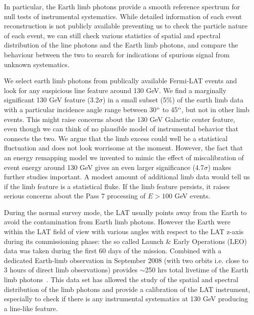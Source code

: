 \documentclass[aps,twocolumn,prd,superscriptaddress,showpacs,nofootinbib,fixfloat]{revtex4}
\newcommand{\degree}{^{\rm o}}
\begin{document}
In particular, the Earth limb photons provide a smooth
reference spectrum for null tests of instrumental
systematics. While detailed information of each event
reconstruction is not publicly available preventing us to
check the particle nature of each event, we can still check
various statistics of spatial and spectral distribution of
the line photons and the Earth limb photons, and compare the
behaviour between the two to search for indications of
spurious signal from unknown systematics. 

We select earth limb photons from publically available Fermi-LAT events and look for any suspicious line feature around 130 GeV.  We find a marginally significant 130 GeV feature (3.2$\sigma$) in a small
subset (5\%) of the earth limb data with a particular incidence angle range between 30$\degree$ to 45$\degree$, but not in other limb events.  This might raise concerns about
the 130 GeV Galactic center feature, even though we can
think of no plausible model of instrumental behavior that
connects the two.  We argue that the limb excess could well
be a statistical fluctuation and does not look worrisome at
the moment. However, the fact that an energy remapping model we invented to mimic the effect of miscalibration of event energy around 130 GeV
gives an even larger significance (4.7$\sigma$) makes further studies
important. A modest amount of additional limb data would
tell us if the limb feature is a statistical fluke.  If the
limb feature persists, it raises serious concerns about the
Pass 7 processing of $E > 100$ GeV events. 


During the normal survey mode, the LAT usually points away
from the Earth to avoid the contamination from Earth limb photons. However the Earth
were within the LAT field of view with various angles with
respect to the LAT z-axis during its commissioning phase:
the so called Launch \& Early Operations (LEO) data was taken during the first 60 days of the mission. Combined with
a dedicated Earth-limb observation in September 2008 (with
two orbits i.e. close to 3 hours of direct limb
observations) provides $\sim$250 hrs total livetime of the Earth limb photons~\cite{FermiLimb}. This data set has allowed the study of
the spatial and spectral distribution of the limb photons
and provide a calibration of the LAT instrument, especially
to check if there is any instrumental systematics at 130 GeV
producing a line-like feature.
\end{document}
